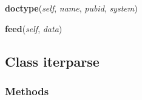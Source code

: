     \label{xml:etree:ElementTree:XMLTreeBuilder:doctype}

    \vspace{0.5ex}

\hspace{.8\funcindent}\begin{boxedminipage}{\funcwidth}

    \raggedright \textbf{doctype}(\textit{self}, \textit{name}, \textit{pubid}, \textit{system})

\setlength{\parskip}{2ex}
\setlength{\parskip}{1ex}
    \end{boxedminipage}

    \label{xml:etree:ElementTree:XMLTreeBuilder:feed}

    \vspace{0.5ex}

\hspace{.8\funcindent}\begin{boxedminipage}{\funcwidth}

    \raggedright \textbf{feed}(\textit{self}, \textit{data})

\setlength{\parskip}{2ex}
\setlength{\parskip}{1ex}
    \end{boxedminipage}



\subsection{Class iterparse}

    \label{xml:etree:ElementTree:iterparse}


  \subsubsection{Methods}

